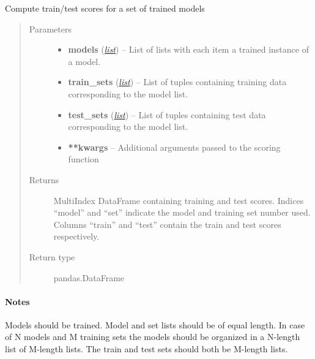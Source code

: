 \documentclass[letterpaper,10pt,english]{sphinxmanual}
\begin{document}
\begin{fulllineitems}
\label{classification:flamingo.classification.models.score_models}
Compute train/test scores for a set of trained models
\begin{quote}\begin{description}
\item[{Parameters}] \leavevmode\begin{itemize}
\item {} 
\textbf{models} (\href{http://docs.python.org/library/functions.html\#list}{\emph{list}}) -- List of lists with each item a trained instance of a model.

\item {} 
\textbf{train\_sets} (\href{http://docs.python.org/library/functions.html\#list}{\emph{list}}) -- List of tuples containing training data corresponding to the
model list.

\item {} 
\textbf{test\_sets} (\href{http://docs.python.org/library/functions.html\#list}{\emph{list}}) -- List of tuples containing test data corresponding to the model
list.

\item {} 
\textbf{**kwargs} -- 
Additional arguments passed to the scoring function


\end{itemize}

\item[{Returns}] \leavevmode
MultiIndex DataFrame containing training and test scores.
Indices ``model'' and ``set'' indicate the model and training set number used.
Columns ``train'' and ``test'' contain the train and test scores respectively.

\item[{Return type}] \leavevmode
pandas.DataFrame

\end{description}\end{quote}
\paragraph{Notes}

Models should be trained.
Model and set lists should be of equal length.
In case of N models and M training sets the models should be
organized in a N-length list of M-length lists. The train and test
sets should both be M-length lists.

\end{fulllineitems}
\end{document}
